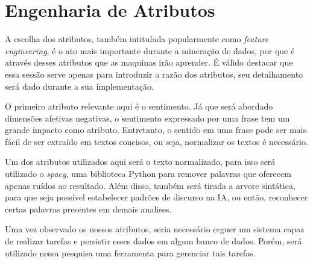 \section{Engenharia de Atributos}
A escolha dos atributos, também intitulada popularmente como \textit{feature engineering}, é o ato mais importante durante a mineração de dados, por que é através desses atributos que as maquinas irão aprender. É válido destacar que essa sessão serve apenas para introduzir a razão dos atributos, seu detalhamento será dado durante a sua implementação.

O primeiro atributo relevante aqui é o sentimento. Já que será abordado dimensões afetivas negativas, o sentimento expressado por uma frase tem um grande impacto como atributo. Entretanto, o sentido em uma frase pode ser mais fácil de ser extraído em textos concisos, ou seja, normalizar os textos é necessário.

Um dos atributos utilizados aqui será o texto normalizado, para isso será utilizado o \textit{spacy}, uma biblioteca Python para remover palavras que oferecem apenas ruídos ao resultado. Além disso, também será tirada a arvore sintática, para que seja possível estabelecer padrões de discurso na IA, ou então, reconhecer certas palavras presentes em demais analises.

Uma vez observado os nossos atributos, seria necessário erguer um sistema capaz de realizar tarefas e persistir esses dados em algum banco de dados. Porém, será utilizado nessa pesquisa uma ferramenta para gerenciar tais tarefas.
